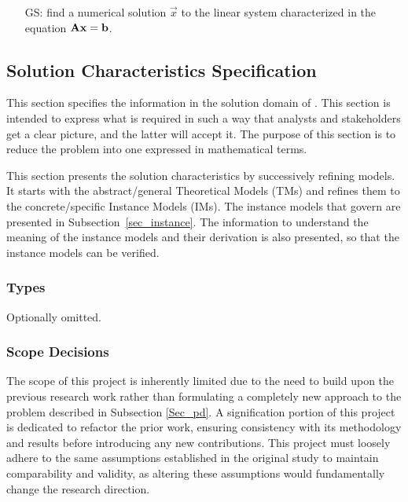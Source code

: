 \documentclass[12pt]{article}
\newcounter{goalnum} %
\begin{document}
\begin{itemize}
\item[GS\refstepcounter{goalnum}\thegoalnum \label{GS:Axb}:] find a numerical
  solution \(\vec{x}\) to the linear system characterized in the equation
  \(\mathbf{A}\mathbf{x} = \mathbf{b}\).
\end{itemize}

\subsection{Solution Characteristics Specification}

This section specifies the information in the solution domain of \progname. This
section is intended to express what is required in such a way that analysts and
stakeholders get a clear picture, and the latter will accept it. The purpose of
this section is to reduce the problem into one expressed in mathematical terms.

This section presents the solution characteristics by successively refining
models. It starts with the abstract/general Theoretical Models (TMs) and refines
them to the concrete/specific Instance Models (IMs). The instance models that
govern \progname are presented in Subsection~\ref{sec_instance}. The
information to understand the meaning of the instance models and their
derivation is also presented, so that the instance models can be verified.

\subsubsection{Types}


Optionally omitted.

\subsubsection{Scope Decisions}

The scope of this project is inherently limited due to the need to build upon
the previous research work rather than formulating a completely new approach to
the problem described in Subsection \ref{Sec_pd}. A signification portion of this
project is dedicated to refactor the prior work, ensuring consistency with its
methodology and results before introducing any new contributions. This project
must loosely adhere to the same assumptions established in the original study to
maintain comparability and validity, as altering these assumptions would
fundamentally change the research direction.
\end{document}
